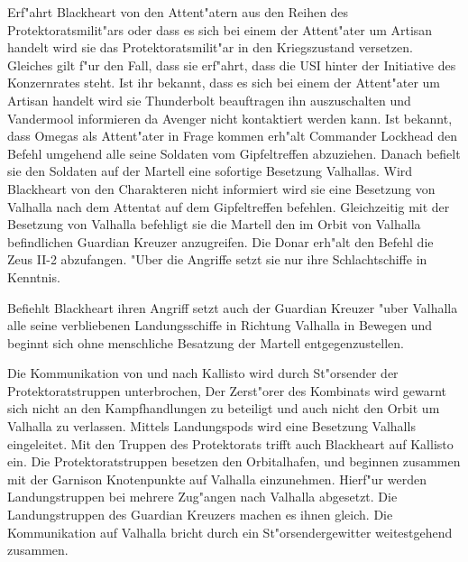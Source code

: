 
Erf"ahrt Blackheart von den Attent"atern aus den Reihen des Protektoratsmilit"ars oder dass es sich bei einem der Attent"ater um Artisan handelt wird sie das Protektoratsmilit"ar in den Kriegszustand versetzen. Gleiches gilt f"ur den Fall, dass sie erf"ahrt, dass die USI hinter der Initiative des Konzernrates steht. Ist ihr bekannt, dass es sich bei einem der Attent"ater um Artisan handelt wird sie Thunderbolt beauftragen ihn auszuschalten und Vandermool informieren da Avenger nicht kontaktiert werden kann. Ist bekannt, dass Omegas als Attent"ater in Frage kommen erh"alt Commander Lockhead den Befehl umgehend alle seine Soldaten vom Gipfeltreffen abzuziehen. Danach befielt sie den Soldaten auf der Martell eine sofortige Besetzung Valhallas. Wird Blackheart von den Charakteren nicht informiert wird sie eine Besetzung von Valhalla nach dem Attentat auf dem Gipfeltreffen befehlen. Gleichzeitig mit der Besetzung von Valhalla befehligt sie die Martell den im Orbit von Valhalla befindlichen Guardian Kreuzer anzugreifen. Die Donar erh"alt den Befehl die Zeus II-2 abzufangen. "Uber die Angriffe setzt sie nur ihre Schlachtschiffe in Kenntnis.

Befiehlt Blackheart ihren Angriff setzt auch der Guardian Kreuzer "uber Valhalla alle seine verbliebenen Landungsschiffe in Richtung Valhalla in Bewegen und beginnt sich ohne menschliche Besatzung der Martell entgegenzustellen.

Die Kommunikation von und nach Kallisto wird durch St"orsender der Protektoratstruppen unterbrochen, Der Zerst"orer des Kombinats wird gewarnt sich nicht an den Kampfhandlungen zu beteiligt und auch nicht den Orbit um Valhalla zu verlassen. Mittels Landungspods wird eine Besetzung Valhalls eingeleitet. Mit den Truppen des Protektorats trifft auch Blackheart auf Kallisto ein. Die Protektoratstruppen besetzen den Orbitalhafen, und beginnen zusammen mit der Garnison  Knotenpunkte auf Valhalla einzunehmen. Hierf"ur werden Landungstruppen bei mehrere Zug"angen nach Valhalla abgesetzt. Die Landungstruppen des Guardian Kreuzers machen es ihnen gleich. Die Kommunikation auf Valhalla bricht durch ein St"orsendergewitter weitestgehend zusammen. 

